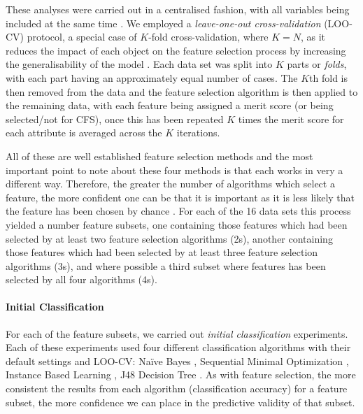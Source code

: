 \documentclass[a4paper,]{book}
\let\oldparagraph\paragraph
\renewcommand{\paragraph}[1]{\oldparagraph{#1}\mbox{}}
\begin{document}
These analyses were carried out in a centralised fashion, with all variables being included at the same time \citep{Bolon-Canedo2015a}. We employed a \emph{leave-one-out cross-validation} (LOO-CV) protocol, a special case of \(K\)-fold cross-validation, where \(K = N\), as it reduces the impact of each object on the feature selection process by increasing the generalisability of the model \citep{Hastie2009}. Each data set was split into \(K\) parts or \emph{folds}, with each part having an approximately equal number of cases. The \(K\)th fold is then removed from the data and the feature selection algorithm is then applied to the remaining data, with each feature being assigned a merit score (or being selected/not for CFS), once this has been repeated \(K\) times the merit score for each attribute is averaged across the \(K\) iterations.

All of these are well established feature selection methods and the most important point to note about these four methods is that each works in very a different way. Therefore, the greater the number of algorithms which select a feature, the more confident one can be that it is important as it is less likely that the feature has been chosen by chance \citep{Visa2011}. For each of the 16 data sets this process yielded a number feature subsets, one containing those features which had been selected by at least two feature selection algorithms (2s), another containing those features which had been selected by at least three feature selection algorithms (3s), and where possible a third subset where features has been selected by all four algorithms (4s).

\hypertarget{initial-classification-1}{%
\paragraph{Initial Classification}\label{initial-classification-1}}

For each of the feature subsets, we carried out \emph{initial classification} experiments. Each of these experiments used four different classification algorithms with their default settings and LOO-CV: Naïve Bayes \citep[NB;][]{John1995}, Sequential Minimal Optimization \citep[SMO;][]{Platt1998}, Instance Based Learning \citep[IBk;][]{Aha1991}, J48 Decision Tree \citep[J48;][]{Quinlan1993}. As with feature selection, the more consistent the results from each algorithm (classification accuracy) for a feature subset, the more confidence we can place in the predictive validity of that subset.
\end{document}
